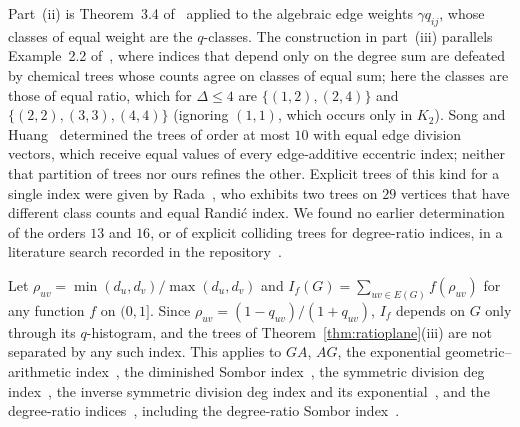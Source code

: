   Part~(ii) is Theorem~3.4 of~\cite{Rada2019ExpVDB} applied to the
  algebraic edge weights $\gamma q_{ij}$, whose classes of equal weight are
  the $q$-classes. The construction in part~(iii) parallels Example~2.2
  of~\cite{RadaRodriguezSigarreta2022Weak}, where indices that depend
  only on the degree sum are defeated by chemical trees whose counts agree
  on classes of equal sum; here the classes are those of equal ratio, which
  for $\Delta \le 4$ are $\{(1,2),(2,4)\}$ and $\{(2,2),(3,3),(4,4)\}$ (ignoring
  $(1,1)$, which occurs only in $K_2$).
  Song and Huang~\cite{SongHuang2023EDV} determined the trees of order at
  most $10$ with equal edge division vectors, which receive equal values of
  every edge-additive eccentric index; neither that partition of trees nor
  ours refines the other. Explicit trees of this kind for a single index were given by Rada~\cite[Example~2.6]{Rada2019ExpVDB}, who exhibits two trees on $29$ vertices that have different class counts and equal Randi\'c index. We found no earlier determination of the orders $13$ and
  $16$, or of explicit colliding trees for degree-ratio indices, in a
  literature search recorded in the repository~\cite{LoyolaRepo}.

  \begin{corollary}\label{cor:ratioclass}
  Let $\rho_{uv} = \min(d_u,d_v)/\max(d_u,d_v)$ and
  $I_f(G) = \sum_{uv \in E(G)} f(\rho_{uv})$ for any function $f$ on
  $(0,1]$. Since $\rho_{uv} = (1-q_{uv})/(1+q_{uv})$, $I_f$ depends on $G$
  only through its $q$-histogram, and the trees of
  Theorem~\ref{thm:ratioplane}(iii) are not separated by any such index.
  This applies to $GA$, $AG$, the exponential geometric--arithmetic
  index~\cite{DasMondal2024ExpGA}, the diminished Sombor
  index~\cite{MovahediGutmanRedzepovicFurtula2026}, the symmetric division
  deg index~\cite{VukicevicGasperov2010}, the inverse symmetric division
  deg index and its exponential~\cite{DasMondalRazaPal2025ExpISDD}, and
  the degree-ratio
  indices~\cite{NyauliBuragohain2027DRSO, GutmanBuragohainNyauli2026},
  including the degree-ratio Sombor
  index~\cite{GutmanRedzepovicBuragohainNyauli2027, AliGutmanEtAl2027DRSO, ShaoJahanbani2027}.
  \end{corollary}

